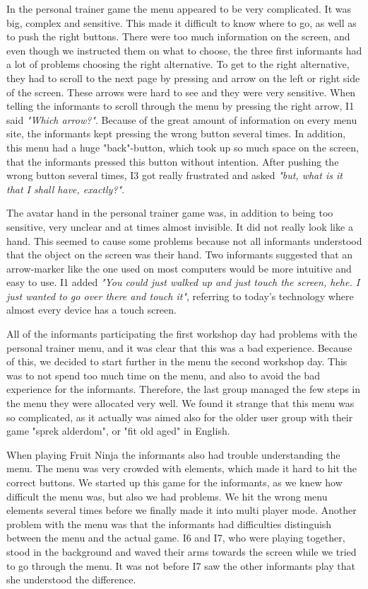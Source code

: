 In the personal trainer game the menu appeared to be very complicated. It was big, complex and sensitive. This made it difficult to know where to go, as well as to push the right buttons. There were too much information on the screen, and even though we instructed them on what to choose, the three first informants had a lot of problems choosing the right alternative. To get to the right alternative, they had to scroll to the next page by pressing and arrow on the left or right side of the screen. These arrows were hard to see and they were very sensitive. When telling the informants to scroll through the menu by pressing the right arrow, I1 said \emph{"Which arrow?"}. Because of the great amount of information on every menu site, the informants kept pressing the wrong button several times. In addition, this menu had a huge "back"-button, which took up so much space on the screen, that the informants pressed this button without intention. After pushing the wrong button several times, I3 got really frustrated and asked \emph{"but, what is it that I shall have, exactly?"}. 

The avatar hand in the personal trainer game was, in addition to being too sensitive, very unclear and at times almost invisible. It did not really look like a hand. This seemed to cause some problems because not all informants understood that the object on the screen was their hand. Two informants suggested that an arrow-marker like the one used on most computers would be more intuitive and easy to use. I1 added \emph{"You could just walked up and just touch the screen, hehe. I just wanted to go over there and touch it"}, referring to today's technology where almost every device has a touch screen.    

All of the informants participating the first workshop day had problems with the personal trainer menu, and it was clear that this was a bad experience. Because of this, we decided to start further in the menu the second workshop day. This was to not spend too much time on the menu, and also to avoid the bad experience for the informants. Therefore, the last group managed the few steps in the menu they were allocated very well. We found it strange that this menu was so complicated, as it actually was aimed also for the older user group with their game "sprek alderdom", or "fit old aged" in English. 

When playing Fruit Ninja the informants also had trouble understanding the menu. The menu was very crowded with elements, which made it hard to hit the correct buttons. We started up this game for the informants, as we knew how difficult the menu was, but also we had problems. We hit the wrong menu elements several times  before we finally made it into multi player mode. Another problem with the menu was that the informants had difficulties distinguish between the menu and the actual game. I6 and I7, who were playing together, stood in the background and waved their arms towards the screen while we tried to go through the menu. It was not before I7 saw the other informants play that she understood the difference. 

